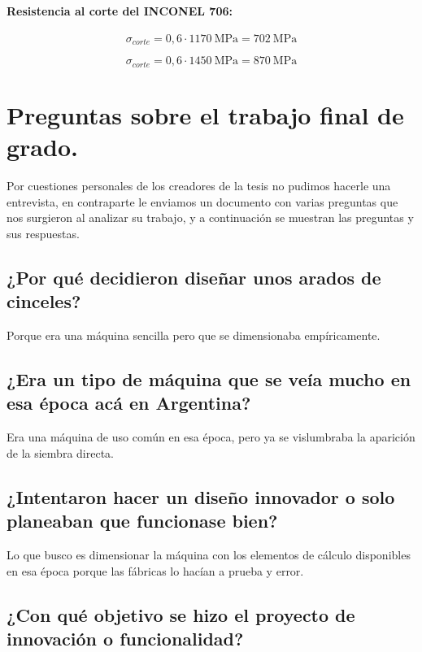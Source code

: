 \documentclass[15pt,a4paper]{article}
\begin{document}
\paragraph{Resistencia al corte del INCONEL 706:}

\begin{equation}
    \sigma_{corte} = 0,6 \cdot \SI{1170}{\mega\pascal} = \SI{702}{\mega\pascal}
\end{equation}

\begin{equation}
    \sigma_{corte} = 0,6 \cdot \SI{1450}{\mega\pascal} = \SI{870}{\mega\pascal}
\end{equation}

\section{Preguntas sobre el trabajo final de grado.}

Por cuestiones personales de los creadores de la tesis no pudimos hacerle una entrevista, en contraparte le enviamos un documento con varias preguntas que nos surgieron al analizar su trabajo, y a continuación se muestran las preguntas y sus respuestas.

\subsection{¿Por qué decidieron diseñar unos arados de cinceles?}

Porque era una máquina sencilla pero que se dimensionaba empíricamente.

\subsection{¿Era un tipo de máquina que se veía mucho en esa época acá en Argentina?}

Era una máquina de uso común en esa época, pero ya se vislumbraba la aparición de la siembra directa.

\subsection{¿Intentaron hacer un diseño innovador o solo planeaban que funcionase bien?}

Lo que busco es dimensionar la máquina con los elementos de cálculo disponibles en esa época porque las fábricas lo hacían a prueba y error.

\subsection{¿Con qué objetivo se hizo el proyecto de innovación o funcionalidad?}
\end{document}
